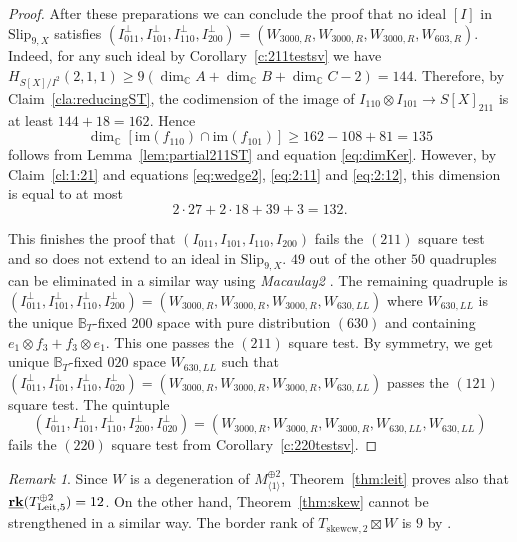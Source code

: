\documentclass[12pt]{amsart}
\theoremstyle{definition}
\theoremstyle{remark}
\newtheorem{remark}[theorem]{Remark}
\theoremstyle{definition}
\newcommand{\brk}{{\underline{{\bf rk}}}}
\newcommand{\HF}[2]{H_{#1}(#2)}
\newcommand{\Slip}[2]{\mathrm{Slip}_{#1,#2}}
\newcommand{\CC}{\mathbb{C}}
\begin{document}
\begin{proof}
After these preparations we can conclude the proof that no ideal $[I]$ in $\Slip{9}{X}$ satisfies  $(I_{011}^\perp, I_{101}^\perp, I_{110}^\perp, I_{200}^\perp) = (W_{3000,R}, W_{3000,R}, W_{3000,R}, W_{603,R})$. Indeed, for any such ideal by Corollary~\ref{c:211testsv} we have $\HF{S[X]/I^2}{2,1,1} \ge 9(\dim_\CC A+\dim_\CC B+\dim_\CC C-2) = 144$. Therefore, by Claim~\ref{cla:reducingST}, the codimension of the image of $I_{110}\otimes I_{101} \to S[X]_{211}$ is at least $144 + 18 = 162$. Hence 
\[
\dim_\CC [\mathrm{im}(f_{110}) \cap \mathrm{im}(f_{101})] \ge 162 - 108 + 81 = 135
\]
follows from Lemma~\ref{lem:partial211ST} and equation \eqref{eq:dimKer}.
However, by Claim~\ref{cl:1:21} and equations \eqref{eq:wedge2}, \eqref{eq:2:11} and \eqref{eq:2:12}, this dimension is equal to at most 
\[
2\cdot 27 + 2\cdot 18 + 39 + 3 = 132.
\]

This finishes the proof that $(I_{011}, I_{101}, I_{110}, I_{200})$ fails the $(211)$ square test and so does not extend to an ideal in $\Slip{9}{X}$. $49$ out of the other $50$ quadruples can be eliminated in a similar way using \textit{Macaulay2} \cite{M2}. The remaining quadruple is $(I_{011}^\perp, I_{101}^\perp, I_{110}^\perp, I_{200}^\perp) = (W_{3000,R}, W_{3000,R}, W_{3000,R}, W_{630,LL})$ where $W_{630,LL}$ is the unique $\mathbb{B}_T$-fixed $200$ space with pure distribution $(630)$ and containing $e_1\otimes f_3 + f_3\otimes e_1$. This one passes the $(211)$ square test. By symmetry, we get unique $\mathbb{B}_T$-fixed $020$ space $W_{630,LL}$ such that $(I_{011}^\perp, I_{101}^\perp, I_{110}^\perp, I_{020}^\perp) = (W_{3000,R}, W_{3000,R}, W_{3000,R}, W_{630,LL})$ passes the $(121)$ square test. The quintuple
\[
(I_{011}^\perp, I_{101}^\perp, I_{110}^\perp, I_{200}^\perp, I_{020}^\perp) = (W_{3000,R}, W_{3000,R}, W_{3000,R}, W_{630,LL}, W_{630,LL})
\]
fails the $(220)$ square test from Corollary~\ref{c:220testsv}.
\end{proof}

\begin{remark}
Since $W$ is a degeneration of $M_{\langle 1\rangle}^{\oplus 2}$, Theorem~\ref{thm:leit} proves also that $\brk(T_{\mathrm{Leit},{5}}^{\oplus 2}) = 12$.
On the other hand, Theorem~\ref{thm:skew} cannot be strengthened in a similar way. The border rank of $T_{\mathrm{skewcw},2}\boxtimes W$ is $9$ by \cite[Proposition~8.4]{HL26}.
\end{remark}
\end{document}
